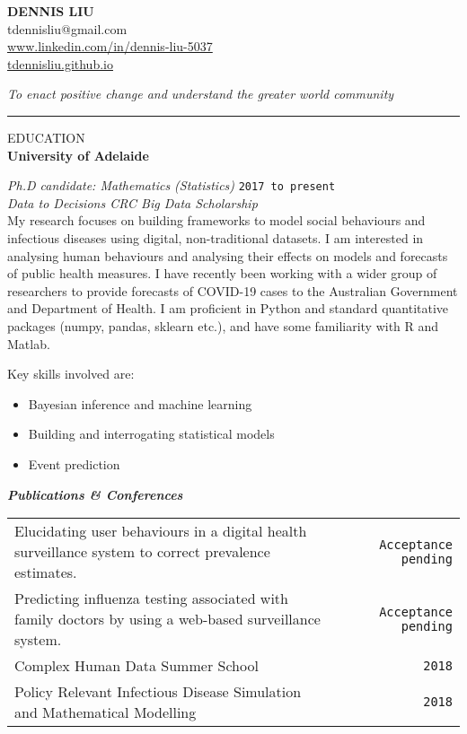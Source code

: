 \documentclass{article}
\newcommand{\HRule}{\rule{\linewidth}{0.5mm}}
\begin{document}
\begin{center} 

\textbf{\huge{DENNIS LIU}}
\\[0.7cm]

tdennisliu@gmail.com \\
\url{www.linkedin.com/in/dennis-liu-5037} \\
\url{tdennisliu.github.io}

\end{center}
\emph{To enact positive change and understand the greater world community} 


\HRule

{\footnotesize EDUCATION}
\\

\textbf{\large University of Adelaide} 

\emph{Ph.D candidate: Mathematics (Statistics)} \hfill \texttt{2017 to present}\\[0.2cm]
\footnotesize{\emph{Data to Decisions CRC Big Data Scholarship}}\\

My research focuses on building frameworks to model social behaviours and infectious diseases using digital, non-traditional datasets. I am interested in analysing human behaviours and analysing their effects on models and forecasts of public health measures. I have recently been working with a wider group of researchers to provide forecasts of COVID-19 cases to the Australian Government and Department of Health. I am proficient in Python and standard quantitative packages (numpy, pandas, sklearn etc.), and have some familiarity with R and Matlab.

Key skills involved are:

\begin{itemize}
	\item Bayesian inference and machine learning
	\item Building and interrogating statistical models
	\item Event prediction
\end{itemize}

\textbf{\emph{Publications \& Conferences}}
\begin{table}[h!] \small
\begin{tabular}{ p{12.1cm} c r}
	
 Elucidating user behaviours in a digital health surveillance system to correct prevalence estimates. & & \texttt{Acceptance pending} \\

 Predicting influenza testing associated with family doctors by using a web-based surveillance system. & & \texttt{Acceptance pending} \\

 Complex Human Data Summer School & & \texttt{2018} \\
 Policy Relevant Infectious Disease Simulation and Mathematical Modelling& & \texttt{2018} \\

\end{tabular}
\end{table}
\end{document}
